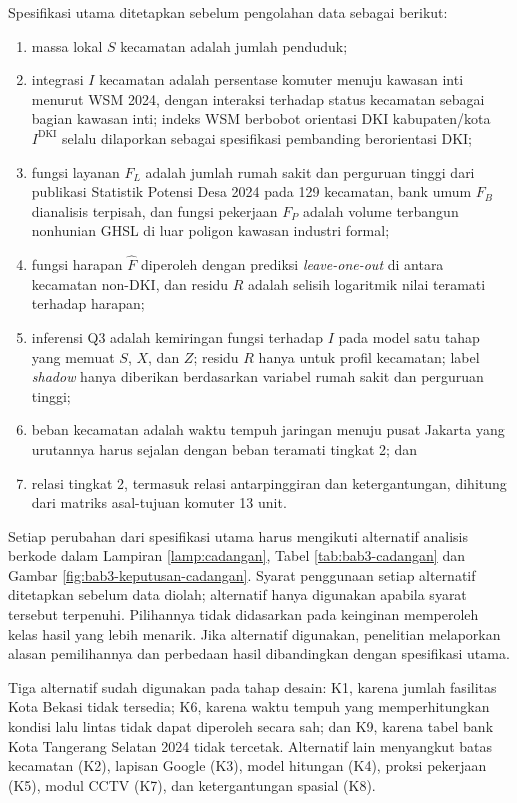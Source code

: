 \documentclass[12pt,a4paper,oneside,openany,indonesian]{report}
\begin{document}
Spesifikasi utama ditetapkan sebelum pengolahan data sebagai berikut:

\begin{enumerate}
\tightlist
\item
  massa lokal $S$ kecamatan adalah jumlah penduduk;
\item
  integrasi $I$ kecamatan adalah persentase komuter menuju kawasan inti
  menurut WSM 2024, dengan interaksi terhadap status kecamatan sebagai
  bagian kawasan inti; indeks WSM berbobot orientasi DKI kabupaten/kota
  $I^{\mathrm{DKI}}$ selalu dilaporkan sebagai spesifikasi pembanding
  berorientasi DKI;
\item
  fungsi layanan $F_L$ adalah jumlah rumah sakit dan perguruan tinggi
  dari publikasi Statistik Potensi Desa 2024 pada 129 kecamatan, bank
  umum $F_B$ dianalisis terpisah, dan fungsi pekerjaan $F_P$
  adalah volume terbangun nonhunian GHSL di luar poligon kawasan
  industri formal;
\item
  fungsi harapan $\widehat F$ diperoleh dengan prediksi
  \emph{leave-one-out} di antara kecamatan non-DKI, dan residu $R$
  adalah selisih logaritmik nilai teramati terhadap harapan;
\item
  inferensi Q3 adalah kemiringan fungsi terhadap $I$ pada model satu
  tahap yang memuat $S$, $X$, dan $Z$; residu $R$ hanya untuk profil
  kecamatan; label \emph{shadow} hanya diberikan berdasarkan variabel rumah
  sakit dan perguruan tinggi;
\item
  beban kecamatan adalah waktu tempuh jaringan menuju pusat Jakarta yang
  urutannya harus sejalan dengan beban teramati tingkat 2; dan
\item
  relasi tingkat 2, termasuk relasi antarpinggiran dan ketergantungan,
  dihitung dari matriks asal-tujuan komuter 13 unit.
\end{enumerate}

Setiap perubahan dari spesifikasi utama harus mengikuti alternatif
analisis berkode dalam Lampiran \ref{lamp:cadangan}, Tabel
\ref{tab:bab3-cadangan} dan Gambar \ref{fig:bab3-keputusan-cadangan}.
Syarat penggunaan setiap alternatif ditetapkan sebelum data diolah;
alternatif hanya digunakan apabila syarat tersebut terpenuhi.
Pilihannya tidak didasarkan pada keinginan memperoleh kelas hasil yang
lebih menarik. Jika alternatif digunakan, penelitian melaporkan alasan
pemilihannya dan perbedaan hasil dibandingkan dengan spesifikasi utama.

Tiga alternatif sudah digunakan pada tahap desain: K1, karena jumlah fasilitas Kota Bekasi tidak tersedia; K6, karena waktu tempuh yang memperhitungkan kondisi lalu lintas tidak dapat diperoleh secara sah; dan K9, karena tabel bank Kota Tangerang Selatan 2024 tidak tercetak. Alternatif lain menyangkut batas kecamatan (K2), lapisan Google (K3), model hitungan (K4), proksi pekerjaan (K5), modul CCTV (K7), dan ketergantungan spasial (K8).
\end{document}
